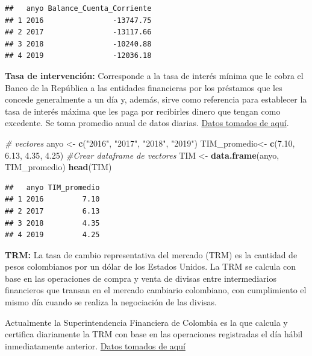 \documentclass[
  11pt,
  a4paper,
]{book}
\newenvironment{Shaded}{\begin{snugshade}}{\end{snugshade}}
\newcommand{\CommentTok}[1]{\textcolor[rgb]{0.56,0.35,0.01}{\textit{#1}}}
\newcommand{\FloatTok}[1]{\textcolor[rgb]{0.00,0.00,0.81}{#1}}
\newcommand{\KeywordTok}[1]{\textcolor[rgb]{0.13,0.29,0.53}{\textbf{#1}}}
\newcommand{\NormalTok}[1]{#1}
\newcommand{\StringTok}[1]{\textcolor[rgb]{0.31,0.60,0.02}{#1}}
\begin{document}
\begin{verbatim}
##   anyo Balance_Cuenta_Corriente
## 1 2016                -13747.75
## 2 2017                -13117.66
## 3 2018                -10240.88
## 4 2019                -12036.18
\end{verbatim}

\textbf{Tasa de intervención:} Corresponde a la tasa de interés mínima
que le cobra el Banco de la República a las entidades financieras por
los préstamos que les concede generalmente a un día y, además, sirve
como referencia para establecer la tasa de interés máxima que les paga
por recibirles dinero que tengan como excedente. Se toma promedio anual
de datos diarias.
\href{https://www.banrep.gov.co/es/estadisticas/tasas-interes-politica-monetaria}{Datos
tomados de aquí}.

\begin{Shaded}
\begin{Highlighting}[]
\CommentTok{# vectores }
\NormalTok{anyo <-}\StringTok{ }\KeywordTok{c}\NormalTok{(}\StringTok{"2016"}\NormalTok{, }\StringTok{"2017"}\NormalTok{, }\StringTok{"2018"}\NormalTok{, }\StringTok{"2019"}\NormalTok{)}
\NormalTok{TIM_promedio<-}\StringTok{ }\KeywordTok{c}\NormalTok{(}\FloatTok{7.10}\NormalTok{, }\FloatTok{6.13}\NormalTok{, }\FloatTok{4.35}\NormalTok{, }\FloatTok{4.25}\NormalTok{)}
\CommentTok{#Crear dataframe de vectores}
\NormalTok{TIM <-}\StringTok{ }\KeywordTok{data.frame}\NormalTok{(anyo, TIM_promedio)}
\KeywordTok{head}\NormalTok{(TIM)}
\end{Highlighting}
\end{Shaded}

\begin{verbatim}
##   anyo TIM_promedio
## 1 2016         7.10
## 2 2017         6.13
## 3 2018         4.35
## 4 2019         4.25
\end{verbatim}

\textbf{TRM:} La tasa de cambio representativa del mercado (TRM) es la
cantidad de pesos colombianos por un dólar de los Estados Unidos. La TRM
se calcula con base en las operaciones de compra y venta de divisas
entre intermediarios financieros que transan en el mercado cambiario
colombiano, con cumplimiento el mismo día cuando se realiza la
negociación de las divisas.

Actualmente la Superintendencia Financiera de Colombia es la que calcula
y certifica diariamente la TRM con base en las operaciones registradas
el día hábil inmediatamente anterior.
\href{https://www.dolar-colombia.com/historico}{Datos tomados de aquí}
\end{document}

